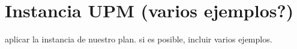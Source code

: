 \section{Instancia UPM (varios ejemplos?)}
aplicar la instancia de nuestro plan. si es posible, incluir varios ejemplos.